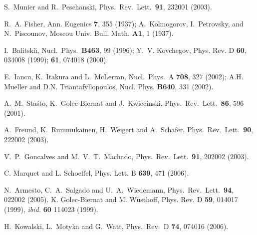 \documentclass[twocolumn,showpacs,preprintnumbers,amsmath,amssymb,showkeys,aps,prd,a4paper,byrevtex]{revtex4}
\begin{document}
\begin{thebibliography}{99}


S.~Munier and R.~Peschanski,
Phys.\ Rev.\ Lett.\  {\bf 91}, 232001 (2003).


R.~A. Fisher,
\newblock Ann. Eugenics {\bf 7}, 355 (1937);
A.~Kolmogorov, I.~Petrovsky, and N.~Piscounov,
\newblock Moscou Univ. Bull. Math. {\bf A1}, 1 (1937).

I.~Balitski\u{\i},
Nucl.\ Phys.\ {\bf B463}, 99 (1996);
Y.~V. Kovchegov,
\newblock Phys. Rev. D {\bf 60}, 034008 (1999);
\newblock
{\bf 61}, 074018 (2000).

E.~Iancu, K.~Itakura and L.~McLerran,
Nucl.\ Phys.\ A {\bf 708}, 327 (2002); A.H. Mueller and D.N. Triantafyllopoulos,  Nucl. Phys. {\bf B640}, 331 (2002).


A.~M.~Sta\'sto, K.~Golec-Biernat and J.~Kwiecinski,
Phys.\ Rev.\ Lett.\  {\bf 86}, 596 (2001).


A.~Freund, K.~Rummukainen, H.~Weigert and A.~Schafer,
Phys.\ Rev.\ Lett.\  {\bf 90}, 222002 (2003).


V.~P.~Goncalves and M.~V.~T.~Machado,
Phys.\ Rev.\ Lett.\  {\bf 91}, 202002 (2003).

C. Marquet and L. Schoeffel,
Phys. Lett. B {\bf 639}, 471  (2006).

N.~Armesto, C.~A.~Salgado and U.~A.~Wiedemann, Phys.\ Rev.\ Lett.\  {\bf 94}, 022002 (2005).
 K. Golec-Biernat and  M. W\"usthoff,  Phys. Rev. D {\bf 59}, 014017 (1999),  {\it ibid.} {\bf 60} 114023 (1999).

  H.~Kowalski, L.~Motyka and G.~Watt,
  Phys.\ Rev.\ D {\bf 74}, 074016 (2006).
  

\end{thebibliography}
\end{document}
